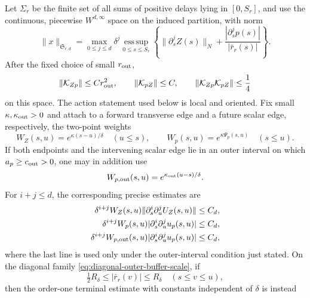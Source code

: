 \begin{lemma}
Let \(\Sigma_r\) be the finite set of all sums of positive delays lying in
\([0,S_r]\), and use the continuous, piecewise \(W^{d,\infty}\) space on
the induced partition, with norm
\begin{equation}
 \|x\|_{\mathfrak S_{r,d}}
 =\max_{0\le j\le d}\delta^j
  \operatorname*{ess\,sup}_{0\le s\le S_r}
  \left\{\|\partial_s^jZ(s)\|_N
       +\frac{|\partial_s^jp(s)|}{|\bar r_r(s)|}\right\}.     \label{eq:repelling-component-strong-space}
\end{equation}
After the fixed choice of small \(r_{\rm out}\),
\begin{equation}
 \|\mathcal K_{Zp}\|\le Cr_{\rm out}^2,\qquad
 \|\mathcal K_{pZ}\|\le C,\qquad
 \|\mathcal K_{Zp}\mathcal K_{pZ}\|\le\frac14              \label{eq:repelling-current-loop-bound}
\end{equation}
on this space.  The action statement used below is local and oriented.  Fix
small \(\kappa,\kappa_{\rm out}>0\) and attach to a forward transverse edge
and a future scalar edge, respectively, the two-point weights
\begin{equation}
 W_Z(s,u)=e^{\kappa(s-u)/\delta}\quad(u\le s),\qquad
 W_p(s,u)=e^{\kappa\Psi_p(s,u)}\quad(s\le u).        \label{eq:repelling-oriented-edge-weights}
\end{equation}
If both endpoints and the intervening scalar edge lie in an outer interval
on which \(a_p\ge c_{\rm out}>0\), one may in addition use
\begin{equation}
 W_{p,{\rm out}}(s,u)=e^{\kappa_{\rm out}(u-s)/\delta}.
                                                               \label{eq:repelling-terminal-edge-weight}
\end{equation}
For \(i+j\le d\), the corresponding precise estimates are
\begin{align}
 \delta^{i+j}W_Z(s,u)
       \|\partial_s^i\partial_u^jU_Z(s,u)\|&\le C_d,\notag\\
 \delta^{i+j}W_p(s,u)
       |\partial_s^i\partial_u^ju_p(s,u)|&\le C_d,\notag\\
 \delta^{i+j}W_{p,{\rm out}}(s,u)
       |\partial_s^i\partial_u^ju_p(s,u)|&\le C_d,             \label{eq:repelling-weighted-kernel-bounds}
\end{align}
where the last line is used only under the outer-interval condition just
stated.
On the diagonal family
\cref{eq:diagonal-outer-buffer-scale}, if
\[
 \tfrac12R_\delta\le|\bar r_r(v)|\le R_\delta
 \quad(s\le v\le u),
\]
then the order-one terminal estimate with constants independent of
\(\delta\) is instead

\end{lemma}
